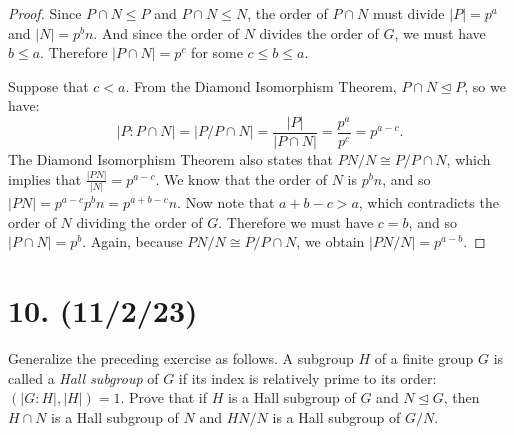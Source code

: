 \documentclass{article}
\begin{document}
\begin{proof}
    Since $P \cap N \leq P$ and $P \cap N \leq N$, the order of $P \cap N$ must divide $|P| = p^a$ and $|N| = p^b n$. And since the order of $N$ divides the order of $G$, we must have $b \leq a$. Therefore $|P \cap N| = p^c$ for some $c \leq b \leq a$.

    Suppose that $c < a$. From the Diamond Isomorphism Theorem, $P \cap N \unlhd P$, so we have:
    \begin{equation*}
        |P : P \cap N| = |P / P \cap N| = \frac{|P|}{|P \cap N|} = \frac{p^a}{p^c} = p^{a - c}.
    \end{equation*}
    The Diamond Isomorphism Theorem also states that $PN / N \cong P / P \cap N$, which implies that $\frac{|PN|}{|N|} = p^{a - c}$. We know that the order of $N$ is $p^b n$, and so $|PN| = p^{a - c} p^b n = p^{a + b - c} n$. Now note that $a + b - c > a$, which contradicts the order of $N$ dividing the order of $G$. Therefore we must have $c = b$, and so $|P \cap N| = p^b$. Again, because $PN / N \cong P / P \cap N$, we obtain $|PN / N| = p^{a - b}$.
\end{proof}

\section*{10. (11/2/23)}

Generalize the preceding exercise as follows. A subgroup $H$ of a finite group $G$ is called a \emph{Hall subgroup} of $G$ if its index is relatively prime to its order: $(|G:H|, |H|) = 1$. Prove that if $H$ is a Hall subgroup of $G$ and $N \unlhd G$, then $H \cap N$ is a Hall subgroup of $N$ and $HN/N$ is a Hall subgroup of $G/N$.
\end{document}

